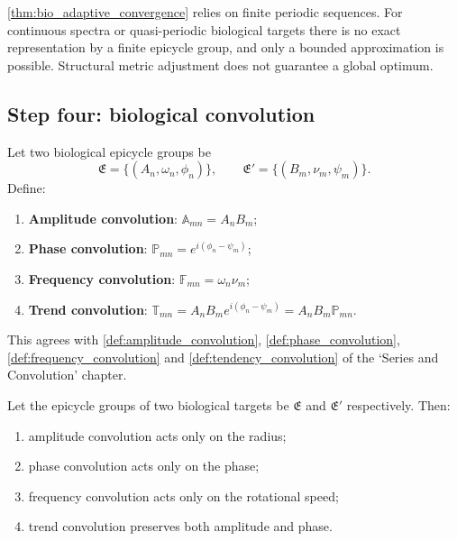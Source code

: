 \begin{remark}\label{rem:bio_adaptive_boundary}
\cref{thm:bio_adaptive_convergence} relies on finite periodic sequences. For continuous spectra or quasi-periodic biological targets there is no exact representation by a finite epicycle group, and only a bounded approximation is possible. Structural metric adjustment does not guarantee a global optimum.
\end{remark}

\subsection{Step four: biological convolution}

\begin{definition}\label{def:bio_convolution_types}
Let two biological epicycle groups be
\[
\mathfrak E=\{(A_n,\omega_n,\phi_n)\},\qquad
\mathfrak E'=\{(B_m,\nu_m,\psi_m)\}.
\]
Define:
\begin{enumerate}[label=(\roman*)]
    \item \textbf{Amplitude convolution}: $\mathbb A_{mn}=A_nB_m$;
    \item \textbf{Phase convolution}: $\mathbb P_{mn}=e^{i(\phi_n-\psi_m)}$;
    \item \textbf{Frequency convolution}: $\mathbb F_{mn}=\omega_n\nu_m$;
    \item \textbf{Trend convolution}: $\mathbb T_{mn}=A_nB_m e^{i(\phi_n-\psi_m)}=A_nB_m\mathbb P_{mn}$.
\end{enumerate}
This agrees with \cref{def:amplitude_convolution}, \cref{def:phase_convolution}, \cref{def:frequency_convolution} and \cref{def:tendency_convolution} of the `Series and Convolution' chapter.
\end{definition}

\begin{theorem}\label{thm:bio_convolution_action}
Let the epicycle groups of two biological targets be $\mathfrak E$ and $\mathfrak E'$ respectively. Then:
\begin{enumerate}[label=(\roman*)]
    \item amplitude convolution acts only on the radius;
    \item phase convolution acts only on the phase;
    \item frequency convolution acts only on the rotational speed;
    \item trend convolution preserves both amplitude and phase.
\end{enumerate}
\end{theorem}

